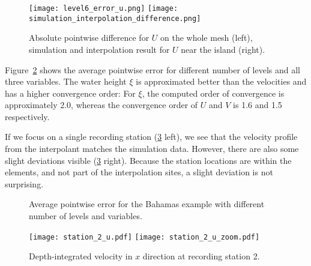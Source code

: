 \documentclass[	a4paper, 
								11pt]{article}
\theoremstyle{plain}
\begin{document}
\begin{figure}
    \centering
    \texttt{[image: level6\_error\_u.png]}
    \hfill
    \texttt{[image: simulation\_interpolation\_difference.png]}
    \caption{Absolute pointwise difference for $U$ on the whole mesh (left), simulation and interpolation result for $U$ near the island (right).}
    \label{fig:SweErrorU}
\end{figure}

Figure~\ref{fig:SweErrorAverage} shows the average pointwise error for different number of levels and all three variables. 
The water height $\xi$ is approximated better than the velocities and has a higher convergence order: For $\xi$, the computed order of convergence is approximately 2.0, whereas the convergence order of $U$ and $V$ is 1.6 and 1.5 respectively.

If we focus on a single recording station (\cref{fig:BahamasStation2} left), we see that the velocity profile from the interpolant matches the simulation data. However, there are also some slight deviations visible (\cref{fig:BahamasStation2} right). Because the station locations are within the elements, and not part of the interpolation sites, a slight deviation is not surprising.

\begin{figure}
    \centering
    \caption{Average pointwise error for the Bahamas example with different number of levels and variables.}
    \label{fig:SweErrorAverage}
\end{figure}

\begin{figure}
    \centering
    \texttt{[image: station\_2\_u.pdf]}%
    \texttt{[image: station\_2\_u\_zoom.pdf]}
    \caption{Depth-integrated velocity in $x$ direction at recording station 2.}
    \label{fig:BahamasStation2}
\end{figure}
\end{document}
